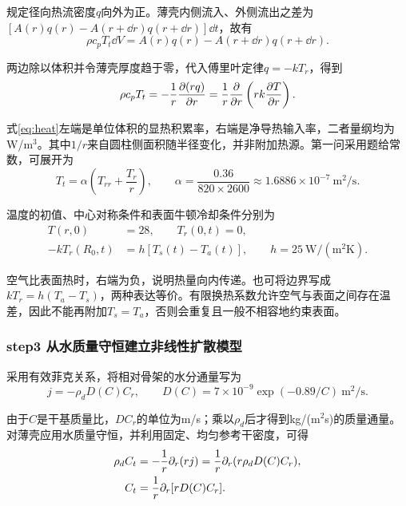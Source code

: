 规定径向热流密度$q$向外为正。薄壳内侧流入、外侧流出之差为$[A(r)q(r)-A(r+\dd r)q(r+\dd r)]\dd t$，故有
\begin{equation}
\rho c_pT_t\dd V=A(r)q(r)-A(r+\dd r)q(r+\dd r).
\end{equation}

两边除以体积并令薄壳厚度趋于零，代入傅里叶定律$q=-kT_r$，得到
\begin{equation}
\rho c_pT_t=-\frac1r\frac{\partial(rq)}{\partial r}
=\frac1r\frac{\partial}{\partial r}\left(rk\frac{\partial T}{\partial r}\right).
\label{eq:heat}
\end{equation}

式\eqref{eq:heat}左端是单位体积的显热积累率，右端是净导热输入率，二者量纲均为W/m$^3$。其中$1/r$来自圆柱侧面积随半径变化，并非附加热源。第一问采用题给常数，可展开为
\begin{equation}
T_t=\alpha\left(T_{rr}+\frac{T_r}{r}\right),\qquad
\alpha=\frac{0.36}{820\times2600}
\approx1.6886\times10^{-7}\ \mathrm{m^2/s}.
\label{eq:linearheat}
\end{equation}

温度的初值、中心对称条件和表面牛顿冷却条件分别为
\begin{align}
T(r,0)&=28,\qquad T_r(0,t)=0,\\
-kT_r(R_0,t)&=h[T_s(t)-T_a(t)],\qquad h=25\ \mathrm{W/(m^2K)}.
\label{eq:heatbc}
\end{align}

空气比表面热时，右端为负，说明热量向内传递。也可将边界写成$kT_r=h(T_a-T_s)$，两种表达等价。有限换热系数允许空气与表面之间存在温差，因此不能再附加$T_s=T_a$，否则会重复且一般不相容地约束表面。

\subsubsection*{step3 从水质量守恒建立非线性扩散模型}
采用有效菲克关系，将相对骨架的水分通量写为
\begin{equation}
j=-\rho_dD(C)C_r,\qquad
D(C)=7\times10^{-9}\exp(-0.89/C)\ \mathrm{m^2/s}.
\label{eq:fick}
\end{equation}

由于$C$是干基质量比，$D C_r$的单位为m/s；乘以$\rho_d$后才得到kg/(m$^2$s)的质量通量。对薄壳应用水质量守恒，并利用固定、均匀参考干密度，可得
\begin{align}
\rho_d C_t&=-\frac1r\partial_r(rj)
=\frac1r\partial_r(r\rho_dD(C)C_r),\\
C_t&=\frac1r\partial_r[rD(C)C_r].
\label{eq:water}
\end{align}

